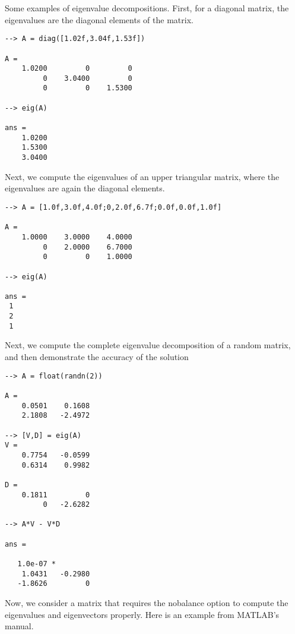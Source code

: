 Some examples of eigenvalue decompositions.  First, for a diagonal
matrix, the eigenvalues are the diagonal elements of the matrix.
\begin{verbatim}
--> A = diag([1.02f,3.04f,1.53f])

A = 
    1.0200         0         0 
         0    3.0400         0 
         0         0    1.5300 

--> eig(A)

ans = 
    1.0200 
    1.5300 
    3.0400 
\end{verbatim}
Next, we compute the eigenvalues of an upper triangular matrix, 
where the eigenvalues are again the diagonal elements.
\begin{verbatim}
--> A = [1.0f,3.0f,4.0f;0,2.0f,6.7f;0.0f,0.0f,1.0f]

A = 
    1.0000    3.0000    4.0000 
         0    2.0000    6.7000 
         0         0    1.0000 

--> eig(A)

ans = 
 1 
 2 
 1 
\end{verbatim}
Next, we compute the complete eigenvalue decomposition of
a random matrix, and then demonstrate the accuracy of the solution
\begin{verbatim}
--> A = float(randn(2))

A = 
    0.0501    0.1608 
    2.1808   -2.4972 

--> [V,D] = eig(A)
V = 
    0.7754   -0.0599 
    0.6314    0.9982 

D = 
    0.1811         0 
         0   -2.6282 

--> A*V - V*D

ans = 

   1.0e-07 * 
    1.0431   -0.2980 
   -1.8626         0 
\end{verbatim}
Now, we consider a matrix that requires the nobalance option
to compute the eigenvalues and eigenvectors properly.  Here is
an example from MATLAB's manual.
